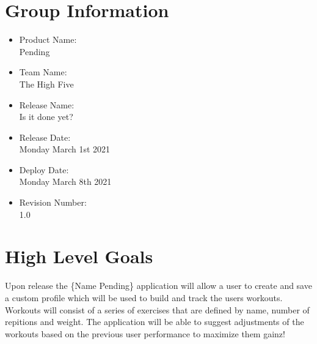 \documentclass[12pt,letterpaper]{article}
\begin{document}
	\section*{Group Information}
		\begin{itemize}
			\item Product Name:\\
				Pending
			\item Team Name:\\
				The High Five
			\item Release Name:\\
				Is it done yet?
			\item Release Date:\\
				Monday March 1st 2021
			\item Deploy Date:\\
				Monday March 8th 2021
			\item Revision Number:\\
				1.0
		\end{itemize}
	\section{High Level Goals}
		Upon release the \{Name Pending\} application will allow a user to create and save a custom profile which will be used to build and track the users workouts. Workouts will consist of a series of exercises that are defined by name, number of repitions and weight. The application will be able to suggest adjustments of the workouts based on the previous user performance to maximize them gainz!
\end{document}
